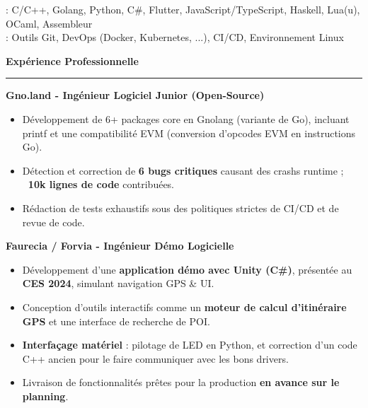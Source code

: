\documentclass[9pt]{extarticle}
\begin{document}
\hspace*{5pt}{\bfseries Techniques}: C/C++, Golang, Python, C\#, Flutter, JavaScript/TypeScript, Haskell, Lua(u), OCaml, Assembleur
\\
\hspace*{5pt}{\bfseries Autres}: Outils Git, DevOps (Docker, Kubernetes, ...), CI/CD, Environnement Linux

\par\vspace{5pt}


{\large\bfseries Expérience Professionnelle}
\par\vspace{-8pt}
\rule{\linewidth}{0.4pt}
\par\vspace{5pt}

{\bfseries Gno.land - Ingénieur Logiciel Junior (Open-Source)}
\begin{itemize}[noitemsep, topsep=0pt]
	\item Développement de 6+ packages core en Gnolang (variante de Go), incluant printf et une compatibilité EVM (conversion d'opcodes EVM en instructions Go).
	\item Détection et correction de {\bfseries 6 bugs critiques} causant des crashs runtime ; {\bfseries ~10k lignes de code} contribuées.
	\item Rédaction de tests exhaustifs sous des politiques strictes de CI/CD et de revue de code.
\end{itemize}

\par\vspace{5pt}

{\bfseries Faurecia / Forvia - Ingénieur Démo Logicielle}
\begin{itemize}[noitemsep, topsep=0pt]
	\item Développement d'une {\bfseries application démo avec Unity (C\#)}, présentée au {\bfseries CES 2024}, simulant navigation GPS \& UI.
	\item Conception d'outils interactifs comme un {\bfseries moteur de calcul d'itinéraire GPS} et une interface de recherche de POI.
	\item {\bfseries Interfaçage matériel} : pilotage de LED en Python, et correction d'un code C++ ancien pour le faire communiquer avec les bons drivers.
	\item Livraison de fonctionnalités prêtes pour la production {\bfseries en avance sur le planning}.
\end{itemize}
\end{document}
